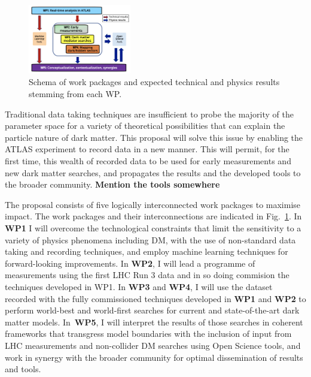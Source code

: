 \documentclass[11pt,a4paper]{article}
\begin{document}
\begin{figure} 
\begin{center}
\includegraphics[width=0.4\textwidth]{figs/WPs}
\caption{\label{fig:WPs} \small Schema of work packages and expected technical and physics results stemming from each WP.}
\end{center}
\end{figure}

Traditional data taking techniques are insufficient to probe the majority of the parameter space for a variety of theoretical possibilities that can explain the particle nature of dark matter. This proposal will solve this issue by enabling the ATLAS experiment to record data in a new manner. This will permit, for the first time, this wealth of recorded data to be used for early measurements and new dark matter searches, and propagates the results and the developed tools to the broader community. \textbf{Mention the tools somewhere}



The proposal consists of five logically interconnected work packages to maximise impact. The work packages and their interconnections are indicated in Fig.~\ref{fig:WPs}. In \textbf{WP1} I will overcome the technological constraints that limit the sensitivity to a variety of physics phenomena including DM, with the use of non-standard data taking and recording techniques, and employ machine learning techniques for forward-looking improvements. In \textbf{WP2}, I will lead a programme of measurements using the first LHC Run 3 data and in so doing commision the techniques developed in WP1. In \textbf{WP3} and \textbf{WP4}, I will use the dataset recorded with the fully commissioned techniques developed in \textbf{WP1} and \textbf{WP2} to perform world-best and world-first searches for current and state-of-the-art dark matter models. In~\textbf{WP5}, I will interpret the results of those searches in coherent frameworks that transgress model boundaries with the inclusion of input from LHC measurements and non-collider DM searches using Open Science tools, and work in synergy with the broader community for optimal dissemination of results and tools. 
\medskip
\end{document}
